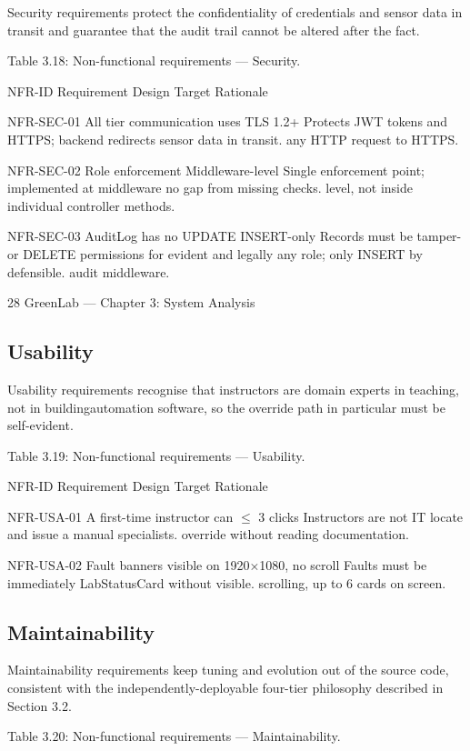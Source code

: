 Security requirements protect the confidentiality of credentials and sensor data in transit and
guarantee that the audit trail cannot be altered after the fact.

Table 3.18: Non-functional requirements --- Security.

NFR-ID Requirement Design Target Rationale

NFR-SEC-01 All tier communication uses TLS 1.2+ Protects JWT tokens and
HTTPS; backend redirects sensor data in transit.
any HTTP request to
HTTPS.

NFR-SEC-02 Role enforcement Middleware-level Single enforcement point;
implemented at middleware no gap from missing checks.
level, not inside individual
controller methods.

NFR-SEC-03 AuditLog has no UPDATE INSERT-only Records must be tamper-
or DELETE permissions for evident and legally
any role; only INSERT by defensible.
audit middleware.




28
GreenLab --- Chapter 3: System Analysis


\subsection{Usability}

Usability requirements recognise that instructors are domain experts in teaching, not in buildingautomation software, so the override path in particular must be self-evident.

Table 3.19: Non-functional requirements --- Usability.

NFR-ID Requirement Design Target Rationale

NFR-USA-01 A first-time instructor can $\le$ 3 clicks Instructors are not IT
locate and issue a manual specialists.
override without reading
documentation.

NFR-USA-02 Fault banners visible on 1920×1080, no scroll Faults must be immediately
LabStatusCard without visible.
scrolling, up to 6 cards on
screen.


\subsection{Maintainability}

Maintainability requirements keep tuning and evolution out of the source code, consistent with the
independently-deployable four-tier philosophy described in Section 3.2.

Table 3.20: Non-functional requirements --- Maintainability.

